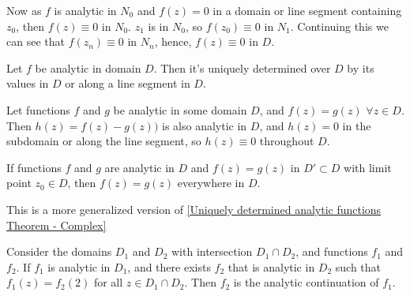 \documentclass[12pt, english]{book}
\makeatletter
\renewenvironment{proof}[1][\proofname]{\par
	\pushQED{\qed}%
	\normalfont \topsep6\p@\@plus6\p@\relax
	\list{}{%
		\settowidth{\leftmargin}{\itshape\proofname:\hskip\labelsep}%
		\setlength{\labelwidth}{0pt}%
		\setlength{\itemindent}{-\leftmargin}%
		}%
	\item[\hskip\labelsep\itshape#1\@addpunct{:}]\ignorespaces
	}{\popQED\endlist\@endpefalse}
\makeatother
\begin{document}
\begin{proof}
\begin{figure}[H]
		\end{figure}
		
		Now as \(f\) is analytic in \(N_0\) and \(f(z) = 0\) in a domain or line segment containing \(z_0\), then \(f(z) \equiv 0 \) in \(N_0\). \(z_1\) is in \(N_0\), so \(f(z_0) \equiv 0\) in \(N_1\). Continuing this we can see that \(f(z_n) \equiv 0\) in \(N_n\), hence, \(f(z) \equiv 0\) in \(D\).
	\end{proof}
	
	\begin{theorem}
		\label{Uniquely determined analytic functions Theorem - Complex}
		Let \(f\) be analytic in domain \(D\). Then it's uniquely determined over \(D\) by its values in \(D\) or along a line segment in \(D\).
	\end{theorem}
	\begin{proof}
		Let functions \(f\) and \(g\) be analytic in some domain \(D\), and \(f(z) = g(z)\) \(\forall z \in D\). Then \(h(z) = f(z) - g(z))\) is also analytic in \(D\), and \(h(z) = 0\) in the subdomain or along the line segment, so \(h(z) \equiv 0\) throughout \(D\). 
	\end{proof}

	\begin{theorem} 
		\label{Coincidence Principle Theorem - Complex}
		If functions \(f\) and \(g\) are analytic in \(D\) and \(f(z) = g(z)\) in \(D' \subset D\) with limit point \(z_0 \in D\), then \(f(z) = g(z)\) everywhere in \(D\).
		
		This is a more generalized version of \cref{Uniquely determined analytic functions Theorem - Complex}
	\end{theorem}
	
	
	\begin{definition}
		\label{Analytic continuation of a function Definition - Complex}
		Consider the domains \(D_1\) and \(D_2\) with intersection \(D_1 \cap D_2\), and functions \(f_1\) and \(f_2\). If \(f_1\) is analytic in \(D_1\), and there exists \(f_2\) that is analytic in \(D_2\) such that \(f_1(z) = f_2(2)\) for all \(z \in D_1 \cap D_2\). Then \(f_2\) is the analytic continuation of \(f_1\). 
	\end{definition}
\end{document}

